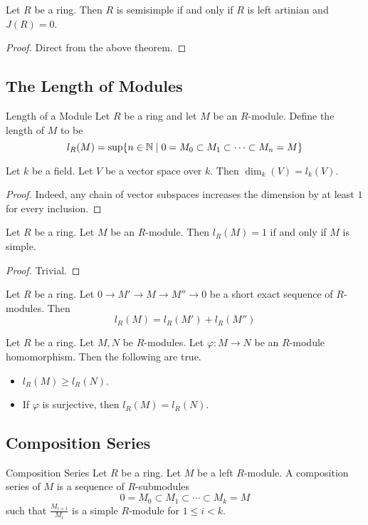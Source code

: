 \documentclass[a4paper]{article}
\begin{document}
\begin{crl}{}{} Let $R$ be a ring. Then $R$ is semisimple if and only if $R$ is left artinian and $J(R)=0$. 
\begin{proof}
Direct from the above theorem. 
\end{proof}
\end{crl}

\subsection{The Length of Modules}
\begin{defn}{Length of a Module}{} Let $R$ be a ring and let $M$ be an $R$-module. Define the length of $M$ to be $$l_R(M)=\text{sup}\{n\in\mathbb{N}\;|\;0=M_0\subset M_1\subset\cdots\subset M_n=M\}$$
\end{defn}

\begin{eg}{}{} Let $k$ be a field. Let $V$ be a vector space over $k$. Then $\dim_k(V)=l_k(V)$. 
\begin{proof}
Indeed, any chain of vector subspaces increases the dimension by at least $1$ for every inclusion. 
\end{proof}
\end{eg}

\begin{lmm}{}{} Let $R$ be a ring. Let $M$ be an $R$-module. Then $l_R(M)=1$ if and only if $M$ is simple. 
\begin{proof}
Trivial. 
\end{proof}
\end{lmm}

\begin{prp}{}{} Let $R$ be a ring. Let $0\to M'\to M\to M''\to 0$ be a short exact sequence of $R$-modules. Then $$l_R(M)=l_R(M')+l_R(M'')$$
\end{prp}

\begin{prp}{}{} Let $R$ be a ring. Let $M,N$ be $R$-modules. Let $\varphi:M\to N$ be an $R$-module homomorphism. Then the following are true. 
\begin{itemize}
\item $l_R(M)\geq l_R(N)$. 
\item If $\varphi$ is surjective, then $l_R(M)=l_R(N)$. 
\end{itemize}
\end{prp}

\subsection{Composition Series}
\begin{defn}{Composition Series}{} Let $R$ be a ring. Let $M$ be a left $R$-module. A composition series of $M$ is a sequence of $R$-submodules $$0=M_0\subset M_1\subset\cdots\subset M_k=M$$ such that $\frac{M_{i+1}}{M_i}$ is a simple $R$-module for $1\leq i<k$. 
\end{defn}
\end{document}
